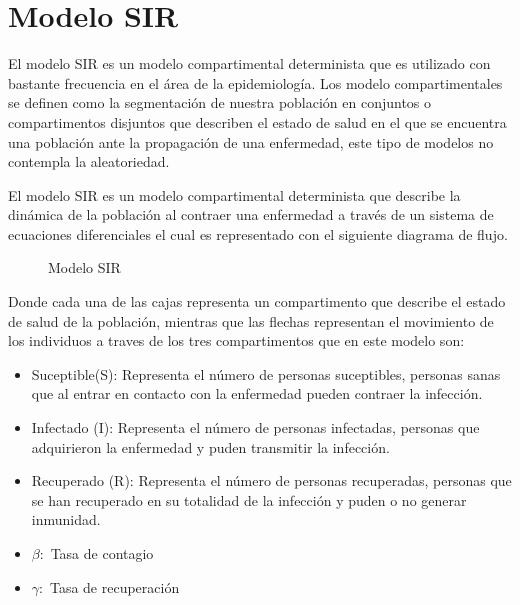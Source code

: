 \chapter{\textbf{Modelo SIR}}

El modelo SIR es un modelo compartimental determinista que es utilizado con bastante frecuencia en el área de la epidemiología. Los modelo compartimentales se definen como la segmentación de nuestra población en conjuntos o compartimentos disjuntos que describen el estado de salud en el que se encuentra una población ante la propagación de una enfermedad, este tipo de modelos no contempla la aleatoriedad.

El modelo SIR es un modelo compartimental determinista que describe la dinámica de la población al contraer una enfermedad a través de un sistema de ecuaciones diferenciales el cual es representado con el siguiente diagrama de flujo.

\begin{figure}[h]
\centering
{}
\caption{Modelo SIR} \label{fig:1.1}
\end{figure}	

Donde cada una de las cajas representa un compartimento que describe el estado de salud de la población, mientras que las flechas representan el movimiento de los individuos a traves de los tres compartimentos que en este modelo son:

\begin{itemize}
\item Suceptible(S): Representa el número de personas suceptibles, personas sanas que al entrar en contacto con la enfermedad pueden contraer la infección.

\item Infectado (I): Representa el número de personas infectadas, personas que adquirieron la enfermedad y puden transmitir la infección.

\item Recuperado (R): Representa el número de personas recuperadas, personas que se han recuperado en su totalidad de la infección y puden o no generar inmunidad.

\item \textbf{$\beta:$} Tasa de contagio

\item \textbf{$\gamma:$} Tasa de recuperación

\end{itemize}

